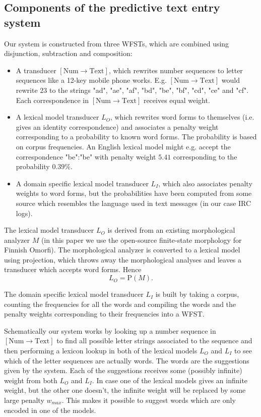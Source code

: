 \documentclass[a4paper,conference]{IEEEtran}
\begin{document}
\subsection{Components of the predictive text entry system}

Our system is constructed from three WFSTs, which are combined using
disjunction, subtraction and composition:

\begin{itemize}
\item A transducer $[\mathrm{Num}\rightarrow\mathrm{Text}]$, which
  rewrites number sequences to letter sequences like a 12-key mobile phone
  works. E.g. $[\mathrm{Num}\rightarrow\mathrm{Text}]$ would rewrite
  $23$ to the strings "ad", "ae", "af", "bd", "be", "bf", "cd", "ce"
  and "cf". Each correspondence in $[\mathrm{Num}\rightarrow\mathrm{Text}]$
  receives equal weight.
\item A lexical model transducer $L_O$, which rewrites word forms to
  themselves (i.e. gives an identity correspondence) and associates a
  penalty weight corresponding to a probability to known word
  forms. The probability is based on corpus frequencies. An English
  lexical model might e.g. accept the correspondence "be":"be" with penalty
  weight $5.41$ corresponding to the probability $0.39\%$.
\item A domain specific lexical model transducer $L_I$, which also
  associates penalty weights to word forms, but the probabilities have
  been computed from some source which resembles the language used in
  text messages (in our case IRC logs).
\end{itemize}

The lexical model transducer $L_O$ is derived from an existing morphological
analyzer $M$ (in this paper we use the open-source finite-state
morphology for Finnish Omorfi). The morphological analyzer is
converted to a lexical model using projection, which throws away the
morphological analyses and leaves a transducer which accepts
word forms. Hence
\begin{equation}L_O = \mathrm{P}(M)\text{.}\end{equation}

The domain specific lexical model transducer $L_I$ is built by taking a
corpus, counting the frequencies for all the words and compiling the
words and the penalty weights corresponding to their frequencies into
a WFST.

Schematically our system works by looking up a number sequence in
$[\mathrm{Num}\rightarrow\mathrm{Text}]$ to find all possible letter
strings associated to the sequence and then performing a lexicon
lookup in both of the lexical models $L_O$ and $L_I$ to see which of the
letter sequences are actually words. The words are the suggestions
given by the system. Each of the suggestions receives some (possibly
infinite) weight from both $L_O$ and $L_I$. In case one of the
lexical models gives an infinite weight, but the other one doesn't, the
infinite weight will be replaced by some large penalty $w_{max}$. This
makes it possible to suggest words which are only encoded in one of
the models.
\end{document}
